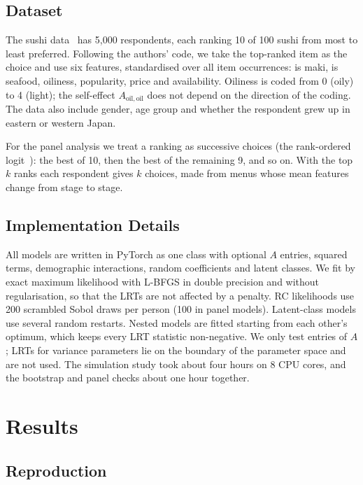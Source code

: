 \documentclass[11pt,journal,a4paper]{IEEEtran}
\newcommand{\Aoo}{A_{\mathrm{oil,oil}}}
\begin{document}
\subsection{Dataset}

The sushi data~\cite{kamishima03} has 5,000 respondents, each ranking 10 of 100 sushi from most to least
preferred. Following the authors' code, we take the top-ranked item as the
choice and use six features, standardised over all item occurrences: is maki, is seafood, oiliness,
popularity, price and availability. Oiliness is coded from 0 (oily) to 4 (light); the self-effect $\Aoo$ does
not depend on the direction of the coding. The data also include gender, age group and whether the respondent
grew up in eastern or western Japan.

For the panel analysis we treat a ranking as successive choices (the rank-ordered logit~\cite{beggs81}): the
best of 10, then the best of the remaining 9, and so on. With the top $k$ ranks each respondent gives $k$
choices, made from menus whose mean features change from stage to stage.

\subsection{Implementation Details}

All models are written in PyTorch as one class with optional $A$ entries, squared terms, demographic
interactions, random coefficients and latent classes. We fit by exact maximum likelihood with L-BFGS in
double precision and without regularisation, so that the LRTs are not affected by a penalty. RC likelihoods
use 200 scrambled Sobol draws per person (100 in panel models). Latent-class models use several random
restarts. Nested models are fitted starting from each other's optimum, which keeps every LRT statistic
non-negative. We only test entries of $A$; LRTs for variance parameters lie on the boundary of the parameter
space and are not used. The simulation study took about four hours on 8 CPU cores, and the bootstrap and panel
checks about one hour together.

\section{Results}

\subsection{Reproduction}
\end{document}

